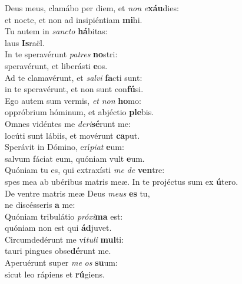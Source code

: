 \evenverse Deus meus, clamábo per diem, et \textit{non} \textit{e}\textbf{xáu}dies:~\*\\
\evenverse et nocte, et non ad insipiéntiam \textbf{mi}hi.\\
\oddverse Tu autem in \textit{san}\textit{cto} \textbf{há}bitas:~\*\\
\oddverse laus \textbf{Is}raël.\\
\evenverse In te speravérunt \textit{pa}\textit{tres} \textbf{no}stri:~\*\\
\evenverse speravérunt, et liberásti \textbf{e}os.\\
\oddverse Ad te clamavérunt, et \textit{sal}\textit{vi} \textbf{fa}cti sunt:~\*\\
\oddverse in te speravérunt, et non sunt con\textbf{fú}si.\\
\evenverse Ego autem sum vermis, \textit{et} \textit{non} \textbf{ho}mo:~\*\\
\evenverse oppróbrium hóminum, et abjéctio \textbf{ple}bis.\\
\oddverse Omnes vidéntes me \textit{de}\textit{ri}\textbf{sé}runt me:~\*\\
\oddverse locúti sunt lábiis, et movérunt \textbf{ca}put.\\
\evenverse Sperávit in Dómino, erí\textit{pi}\textit{at} \textbf{e}um:~\*\\
\evenverse salvum fáciat eum, quóniam vult \textbf{e}um.\\
\oddverse Quóniam tu es, qui extraxísti \textit{me} \textit{de} \textbf{ven}tre:~\*\\
\oddverse spes mea ab ubéribus matris meæ. In te projéctus sum ex \textbf{ú}tero.\\
\evenverse De ventre matris meæ Deus \textit{me}\textit{us} \textbf{es} tu,~\*\\
\evenverse ne discésseris \textbf{a} me:\\
\oddverse Quóniam tribulátio \textit{pró}\textit{xi}\textbf{ma} est:~\*\\
\oddverse quóniam non est qui \textbf{ád}juvet.\\
\evenverse Circumdedérunt me ví\textit{tu}\textit{li} \textbf{mul}ti:~\*\\
\evenverse tauri pingues obse\textbf{dé}runt me.\\
\oddverse Aperuérunt super \textit{me} \textit{os} \textbf{su}um:~\*\\
\oddverse sicut leo rápiens et \textbf{rú}giens.\\
